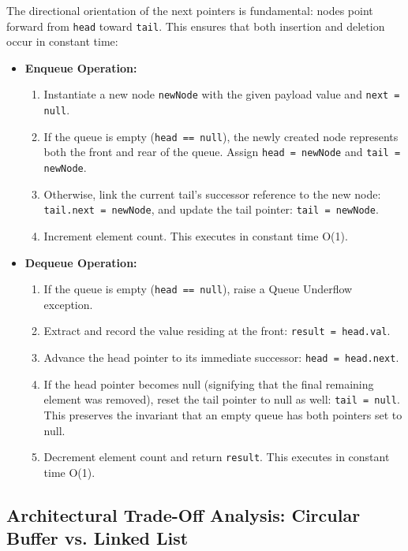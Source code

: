 \documentclass[10pt,journal,compsoc,onecolumn]{IEEEtran}
\begin{document}
The directional orientation of the next pointers is fundamental: nodes point forward from \texttt{head} toward \texttt{tail}. This ensures that both insertion and deletion occur in constant time:
\begin{itemize}
    \item \textbf{Enqueue Operation:}
    \begin{enumerate}
        \item Instantiate a new node \texttt{newNode} with the given payload value and \texttt{next = null}.
        \item If the queue is empty (\texttt{head == null}), the newly created node represents both the front and rear of the queue. Assign \texttt{head = newNode} and \texttt{tail = newNode}.
        \item Otherwise, link the current tail's successor reference to the new node: \texttt{tail.next = newNode}, and update the tail pointer: \texttt{tail = newNode}.
        \item Increment element count. This executes in constant time O(1).
    \end{enumerate}
    \item \textbf{Dequeue Operation:}
    \begin{enumerate}
        \item If the queue is empty (\texttt{head == null}), raise a Queue Underflow exception.
        \item Extract and record the value residing at the front: \texttt{result = head.val}.
        \item Advance the head pointer to its immediate successor: \texttt{head = head.next}.
        \item If the head pointer becomes null (signifying that the final remaining element was removed), reset the tail pointer to null as well: \texttt{tail = null}. This preserves the invariant that an empty queue has both pointers set to null.
        \item Decrement element count and return \texttt{result}. This executes in constant time O(1).
    \end{enumerate}
\end{itemize}

\subsection{Architectural Trade-Off Analysis: Circular Buffer vs. Linked List}
\end{document}
